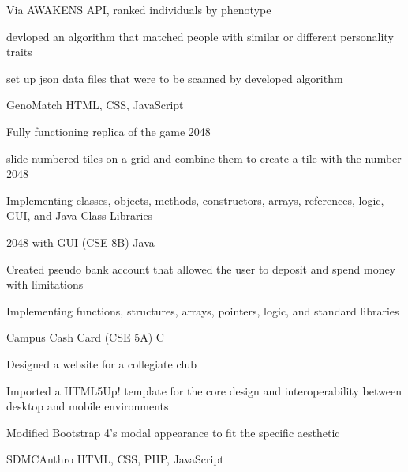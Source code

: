 \documentclass[]{awesome-cv}
\begin{document}
\begin{cventries}
	\cventry
	{\begin{cvitems}
	    \item Via AWAKENS API, ranked individuals by phenotype
        \item devloped an algorithm that matched people with similar or different personality traits
        \item  set up json data files that were to be scanned by developed algorithm 
    \end{cvitems}}
	{GenoMatch}
	{HTML, CSS, JavaScript}
	{}
	{}
	
	\vspace{-5mm}
	\cventry
	{\begin{cvitems}
        \item Fully functioning replica of the game 2048
        \item slide numbered tiles on a grid and combine them to create a tile with the number 2048
        \item Implementing classes, objects, methods, constructors, arrays, references, logic, GUI, and Java Class Libraries
    \end{cvitems}}
	{2048 with GUI (CSE 8B)}
	{Java}
	{}
	{}

	\vspace{-5mm}
	\cventry
	{\begin{cvitems}
        \item Created pseudo bank account that allowed the user to deposit and spend money with limitations
        \item Implementing functions, structures, arrays, pointers, logic, and standard libraries
    \end{cvitems}}
	{Campus Cash Card (CSE 5A)}
	{C}
	{}
	{}

	\vspace{-5mm}
	\cventry
	{\begin{cvitems}
        \item Designed a website for a collegiate club
        \item Imported a HTML5Up! template for the core design and interoperability between desktop and mobile environments
        \item Modified Bootstrap 4’s modal appearance to fit the specific aesthetic
    \end{cvitems}}
	{SDMCAnthro}
	{HTML, CSS, PHP, JavaScript}
	{}
	{}

	\vspace{-5mm}
\end{cventries}
\end{document}
